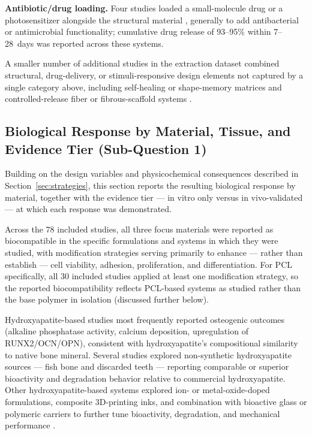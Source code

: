 \documentclass[5p,times,twocolumn]{elsarticle}
\begin{document}
\textbf{Antibiotic/drug loading.} Four studies loaded a small-molecule drug or a photosensitizer alongside the structural material \cite{ref25,ref31,ref33,ref72}, generally to add antibacterial or antimicrobial functionality; cumulative drug release of 93--95\% within 7--28~days was reported across these systems.

A smaller number of additional studies in the extraction dataset combined structural, drug-delivery, or stimuli-responsive design elements not captured by a single category above, including self-healing or shape-memory matrices and controlled-release fiber or fibrous-scaffold systems \cite{ref3,ref35,ref78}.

\subsection{Biological Response by Material, Tissue, and Evidence Tier (Sub-Question 1)}
\label{sec:biocompat}

Building on the design variables and physicochemical consequences described in Section~\ref{sec:strategies}, this section reports the resulting biological response by material, together with the evidence tier --- in vitro only versus in vivo-validated --- at which each response was demonstrated.

Across the 78 included studies, all three focus materials were reported as biocompatible in the specific formulations and systems in which they were studied, with modification strategies serving primarily to enhance --- rather than establish --- cell viability, adhesion, proliferation, and differentiation. For PCL specifically, all 30 included studies applied at least one modification strategy, so the reported biocompatibility reflects PCL-based systems as studied rather than the base polymer in isolation (discussed further below).

Hydroxyapatite-based studies most frequently reported osteogenic outcomes (alkaline phosphatase activity, calcium deposition, upregulation of RUNX2/OCN/OPN), consistent with hydroxyapatite's compositional similarity to native bone mineral. Several studies explored non-synthetic hydroxyapatite sources --- fish bone \cite{ref70} and discarded teeth \cite{ref32} --- reporting comparable or superior bioactivity and degradation behavior relative to commercial hydroxyapatite. Other hydroxyapatite-based systems explored ion- or metal-oxide-doped formulations, composite 3D-printing inks, and combination with bioactive glass or polymeric carriers to further tune bioactivity, degradation, and mechanical performance \cite{ref2,ref41,ref48,ref52,ref66,ref69}.
\end{document}
